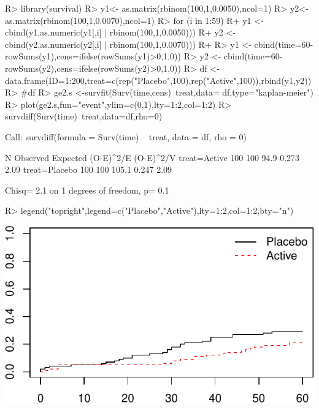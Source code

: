 \documentclass[article]{jss}
\begin{document}
\begin{CodeChunk}

\begin{CodeInput}
R> library(survival)
R> y1<- as.matrix(rbinom(100,1,0.0050),ncol=1)
R> y2<- as.matrix(rbinom(100,1,0.0070),ncol=1)
R> for (i in 1:59){
R+   y1 <- cbind(y1,as.numeric(y1[,i] | rbinom(100,1,0.0050)))
R+   y2 <- cbind(y2,as.numeric(y2[,i] | rbinom(100,1,0.0070)))
R+ }
R> y1 <- cbind(time=60-rowSums(y1),cens=ifelse(rowSums(y1)>0,1,0))
R> y2 <- cbind(time=60-rowSums(y2),cens=ifelse(rowSums(y2)>0,1,0))
R> df <- data.frame(ID=1:200,treat=c(rep("Placebo",100),rep("Active",100)),rbind(y1,y2))
R> #df
R> ge2.s <-survfit(Surv(time,cens)~treat,data= df,type="kaplan-meier")
R> plot(ge2.s,fun="event",ylim=c(0,1),lty=1:2,col=1:2)
R> survdiff(Surv(time)~treat,data=df,rho=0) 
\end{CodeInput}

\begin{CodeOutput}
Call:
survdiff(formula = Surv(time) ~ treat, data = df, rho = 0)

                N Observed Expected (O-E)^2/E (O-E)^2/V
treat=Active  100      100     94.9     0.273      2.09
treat=Placebo 100      100    105.1     0.247      2.09

 Chisq= 2.1  on 1 degrees of freedom, p= 0.1 
\end{CodeOutput}

\begin{CodeInput}
R> legend("topright",legend=c("Placebo","Active"),lty=1:2,col=1:2,bty="n")
\end{CodeInput}


\begin{center}\includegraphics{LKmodelJSS_files/figure-latex/unnamed-chunk-1-1} \end{center}

\end{CodeChunk}
\end{document}
